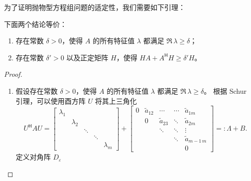 为了证明抛物型方程组问题的适定性，我们需要如下引理：
\begin{lemma}\label{lemma:well-posed-1}
    下面两个结论等价：
    \begin{enumerate}
        \item 存在常数 $\delta >0$，使得 $A$ 的所有特征值 $\lambda$ 都满足 $\Re\, \lambda \ge \delta$；
        \item 存在常数 $\delta' >0$ 以及正定矩阵 $H$，使得 $H A + A^{\mathsf{H}} H \ge \delta' H$。
    \end{enumerate}
\end{lemma}

\begin{proof}
    \noindent
    \begin{enumerate}
        \item 假设存在常数 $\delta >0$，使得 $A$ 的所有特征值 $\lambda$ 都满足 $\Re\, \lambda \ge \delta$。
              根据 Schur 引理，可以使用酉方阵 $U$ 将其上三角化
              \[
                  U^\mathsf{H} A U
                  = \begin{bmatrix}
                      \lambda_1 &           &        &        &           \\
                                & \lambda_2 &        &        &           \\
                                &           & \ddots &        &           \\
                                &           &        & \ddots &           \\
                                &           &        &        & \lambda_m
                  \end{bmatrix}
                  +
                  \begin{bmatrix}
                      0 & \tilde{a}_{12} & \cdots         & \cdots & \tilde{a}_{1m}     \\
                        & 0              & \tilde{a}_{23} & \ddots & \tilde{a}_{2m}     \\
                        &                & \ddots         & \ddots & \vdots             \\
                        &                &                & \ddots & \tilde{a}_{m-1\,m} \\
                        &                &                &        & 0
                  \end{bmatrix}
                  =: \Lambda + B.
              \]
              定义对角阵 $D_\varepsilon$
              \[
\]
\end{enumerate}
\end{proof}

